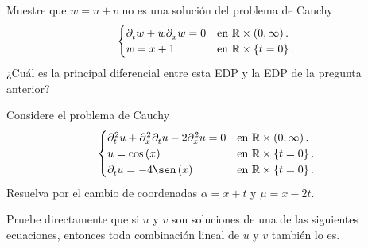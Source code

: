 Muestre que $w=u+v$ no es una solución del problema de Cauchy
\begin{equation*}
	\begin{cases}
		\difcp{w}{t}+
		w
		\difcp{w}{x}=
		0   &
		\text{en }\mathbb{R}\times\left(0,\infty\right). \\
		w=
		x+1 &
		\text{en }\mathbb{R}\times\left\{t=0\right\}.
	\end{cases}
\end{equation*}
¿Cuál es la principal diferencial entre esta EDP y la EDP de la
pregunta anterior?

\question

Considere el problema de Cauchy
\begin{equation*}
	\begin{cases}
		\difcp[2]{u}{t}+
		\difcp[2]{u}{x,t}-
		2\difcp[2]{u}{x}=
		0                    &
		\text{en }\mathbb{R}\times\left(0,\infty\right). \\
		u=
		\cos\left(x\right)   &
		\text{en }\mathbb{R}\times\left\{t=0\right\}.    \\
		\difcp{u}{t}=
		-4\sen\left(x\right) &
		\text{en }\mathbb{R}\times\left\{t=0\right\}.
	\end{cases}
\end{equation*}
Resuelva por el cambio de coordenadas $\alpha=x+t$ y $\mu=x-2t$.

\question

Pruebe directamente que si $u$ y $v$ son soluciones de una de las
siguientes ecuaciones, entonces toda combinación lineal de $u$ y $v$
también lo es.
\begin{multicols}{3}
\end{multicols}

